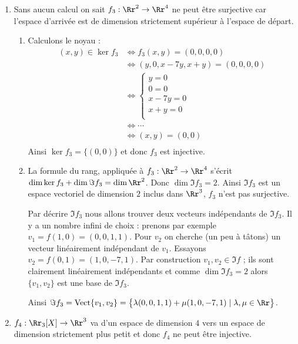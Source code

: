 {{\begin{enumerate}
\begin{enumerate}
  \item $f_2$ n'est ni injective, ni surjective (donc pas bijective).
  \end{enumerate}


  \item Sans aucun calcul on sait $f_3: \Rr^2 \to \Rr^4$ ne peut être surjective 
car l'espace d'arrivée est de dimension strictement
supérieur à l'espace de départ. 
  \begin{enumerate}
  \item Calculons le noyau :
\begin{align*}
(x,y) \in \ker f_3
  & \iff f_3(x,y) = (0,0,0,0) \\
  & \iff  (y,0,x-7y,x+y) = (0,0,0,0) \\
  & \iff \begin{cases}
         y = 0 \\
         0  = 0 \\   
         x-7y = 0 \\ 
         x+y = 0 \\ 
        \end{cases} \\
  & \iff \cdots \\ 
  & \iff (x,y)=(0,0) \\
\end{align*}
Ainsi $\ker f_3 = \{ (0,0) \}$ et donc $f_3$ est injective.

  \item La formule du rang, appliquée à $f_3 : \Rr^2 \to \Rr^4$ s'écrit 
$\dim \ker f_3 + \dim \Im f_3 = \dim \Rr^2$. Donc $\dim \Im f_3 = 2$.
Ainsi $\Im f_3$ est un espace vectoriel de dimension $2$ inclus dans $\Rr^3$,
 $f_3$ n'est pas surjective.

Par décrire $\Im f_3$ nous allons trouver deux vecteurs indépendants de $\Im f_3$.
Il y a un nombre infini de choix : prenons par exemple 
$v_1 = f(1,0) = (0,0,1,1)$. Pour $v_2$ on cherche (un peu à tâtons) un vecteur linéairement indépendant de $v_1$.
Essayons $v_2 = f(0,1)=(1,0,-7,1)$. Par construction $v_1,v_2 \in \Im f$ ; ils sont clairement linéairement indépendants
et comme $\dim \Im f_3=2$ alors $\{v_1,v_2\}$ est une base de $\Im f_3$.

Ainsi $\Im f_3= \text{Vect}\{v_1,v_2\} =\big\{ \lambda(0,0,1,1) + \mu (1,0,-7,1) \mid \lambda,\mu \in \Rr \big\}$.
  \end{enumerate}

  
  
  \item $f_4 : \Rr_3[X] \to \Rr^3$ va d'un espace de dimension $4$ vers un espace de dimension strictement plus petit
et donc $f_4$ ne peut être injective.


\end{enumerate}}}
